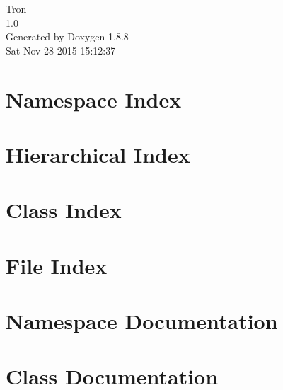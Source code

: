 \documentclass[twoside]{book}
\newcommand{\+}{\discretionary{\mbox{\scriptsize$\hookleftarrow$}}{}{}}
\newcommand{\clearemptydoublepage}{%
  \newpage{\pagestyle{empty}\cleardoublepage}%
}
\begin{document}
\hypersetup{pageanchor=false,
             bookmarks=true,
             bookmarksnumbered=true,
             pdfencoding=unicode
            }
\begin{titlepage}
\vspace*{7cm}
\begin{center}%
{\Large Tron \\[1ex]\large 1.\+0 }\\
\vspace*{1cm}
{\large Generated by Doxygen 1.8.8}\\
\vspace*{0.5cm}
{\small Sat Nov 28 2015 15:12:37}\\
\end{center}
\end{titlepage}
\clearemptydoublepage
\tableofcontents
\clearemptydoublepage
{}
\hypersetup{pageanchor=true}

\chapter{Namespace Index}

\chapter{Hierarchical Index}

\chapter{Class Index}

\chapter{File Index}

\chapter{Namespace Documentation}

\chapter{Class Documentation}

















\end{document}
